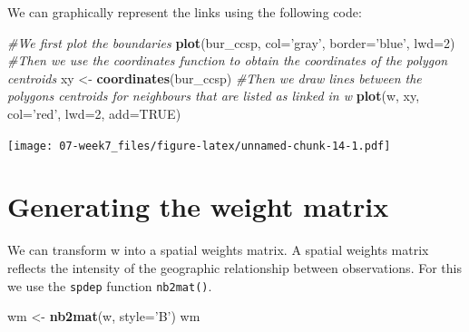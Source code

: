\documentclass[]{book}
\newenvironment{Shaded}{\begin{snugshade}}{\end{snugshade}}
\newcommand{\CommentTok}[1]{\textcolor[rgb]{0.56,0.35,0.01}{\textit{#1}}}
\newcommand{\DataTypeTok}[1]{\textcolor[rgb]{0.13,0.29,0.53}{#1}}
\newcommand{\DecValTok}[1]{\textcolor[rgb]{0.00,0.00,0.81}{#1}}
\newcommand{\KeywordTok}[1]{\textcolor[rgb]{0.13,0.29,0.53}{\textbf{#1}}}
\newcommand{\NormalTok}[1]{#1}
\newcommand{\OtherTok}[1]{\textcolor[rgb]{0.56,0.35,0.01}{#1}}
\newcommand{\StringTok}[1]{\textcolor[rgb]{0.31,0.60,0.02}{#1}}
\begin{document}
We can graphically represent the links using the following code:

\begin{Shaded}
\begin{Highlighting}[]
\CommentTok{#We first plot the boundaries}
\KeywordTok{plot}\NormalTok{(bur_ccsp, }\DataTypeTok{col=}\StringTok{'gray'}\NormalTok{, }\DataTypeTok{border=}\StringTok{'blue'}\NormalTok{, }\DataTypeTok{lwd=}\DecValTok{2}\NormalTok{)}
\CommentTok{#Then we use the coordinates function to obtain the coordinates of the polygon centroids}
\NormalTok{xy <-}\StringTok{ }\KeywordTok{coordinates}\NormalTok{(bur_ccsp)}
\CommentTok{#Then we draw lines between the polygons centroids for neighbours that are listed as linked in w}
\KeywordTok{plot}\NormalTok{(w, xy, }\DataTypeTok{col=}\StringTok{'red'}\NormalTok{, }\DataTypeTok{lwd=}\DecValTok{2}\NormalTok{, }\DataTypeTok{add=}\OtherTok{TRUE}\NormalTok{)}
\end{Highlighting}
\end{Shaded}

\texttt{[image: 07-week7\_files/figure-latex/unnamed-chunk-14-1.pdf]}

\hypertarget{generating-the-weight-matrix}{%
\section{Generating the weight matrix}\label{generating-the-weight-matrix}}

We can transform w into a spatial weights matrix. A spatial weights matrix reflects the intensity of the geographic relationship between observations. For this we use the \texttt{spdep} function \texttt{nb2mat()}.

\begin{Shaded}
\begin{Highlighting}[]
\NormalTok{wm <-}\StringTok{ }\KeywordTok{nb2mat}\NormalTok{(w, }\DataTypeTok{style=}\StringTok{'B'}\NormalTok{)}
\NormalTok{wm}
\end{Highlighting}
\end{Shaded}
\end{document}
